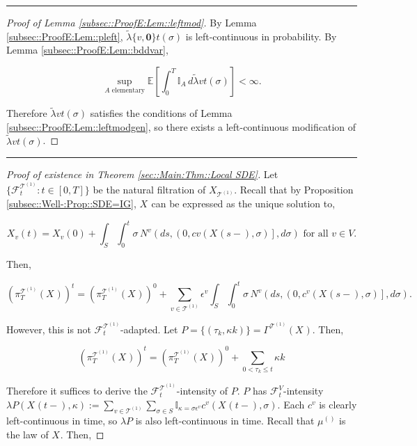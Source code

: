 \documentclass[12pt]{article}
\newcommand{\mb}{\mathbb}
\newcommand{\mc}{\mathcal}
\newcommand{\te}{\text}
\newcommand{\ep}{\epsilon}
\newcommand{\lin}{\rule{\linewidth}{0.4 pt}}
\newcommand{\ex}[1]{\mb{E}\left[#1\right]}			%
\renewcommand{\root}{\mathbf{0}}				%
\renewcommand{\v}{v}							%
\renewcommand{\S}{S}							%
\newcommand{\s}{\sigma}							%
\newcommand{\ev}{\ep}							%
\newcommand{\T}{T}								%
\renewcommand{\t}{t}							%
\newcommand{\proj}{\pi}							%
\renewcommand{\tt}{s}							%
\newcommand{\F}{\mc{F}}							%
\newcommand{\X}{X}								%
\newcommand{\IGr}{c}							%
\newcommand{\vind}[1]{^{#1}}					%
\newcommand{\vsi}[1]{^{#1}}						%
\newcommand{\cind}[1]{_{#1}}					%
\newcommand{\tp}[1]{(#1)}						%
\newcommand{\tip}[1]{#1}						%
\newcommand{\ts}[1]{_{#1}}						%
\newcommand{\tree}{\mc{T}}						%
\newcommand{\sln}[1]{^{(#1)}}					%
\newcommand{\poiss}{N}							%
\newcommand{\rate}{\lambda}						%
\newcommand{\alt}[1]{\widetilde{#1}}			%
\newcommand{\indx}[1]{_{#1}}					%
\newcommand{\m}{\mu}							%
\newcommand{\rt}{\tau}							%
\renewcommand{\it}{k}							%
\newcommand{\pmap}{\Gamma}						%
\renewcommand{\mark}{\kappa}					%
\newcommand{\rp}{P}								%
\newcommand{\typset}{A}							%
\newcommand{\crate}{\alt{\lambda}}				%
\begin{document}
\lin

\begin{proof}[Proof of Lemma \ref{subsec::ProofE:Lem::leftmod}]

By Lemma \ref{subsec::ProofE:Lem::pleft}, \(\crate{\{\v,\root\}}{\t}(\s)\) is left-continuous in probability. By Lemma \ref{subsec::ProofE:Lem::bddvar},

\[\sup_{\typset\te{ elementary}} \ex{\int_0^\T \mb{I}_{\typset}\,d\crate{\v}{\t}(\s)} < \infty.\]

Therefore \(\crate{\v}{\t}(\s)\) satisfies the conditions of Lemma \ref{subsec::ProofE:Lem::leftmodgen}, so there exists a left-continuous modification of \(\crate{\v}{\t}(\s)\).
\end{proof}

\lin

\begin{proof}[Proof of existence in Theorem \ref{sec::Main:Thm::Local SDE}]

Let \(\{\F\vsi{\tree\sln{1}}\ts{\t}:\t\in [0,\T]\}\) be the natural filtration of \(\X\cind{\tree\sln{1}}\tip{}\). Recall that by Proposition \ref{subsec::Well-:Prop::SDE=IG}, \(\X\cind{}\tip{}\) can be expressed as the unique solution to,

\[\X\cind{\v}\tp{\t} = \X\cind{\v}\tp{0} + \int_\S\int_0^\t \s\,\poiss\vind{\v}\left(d\tt,\left(0,c{\v}(\X\cind{}\tp{\tt-},\s)\right],d\s\right) \te{ for all } \v \in V.\]

Then,

\[\left(\proj\vsi{\tree\sln{1}}\ts{\T}(\X\cind{}\tip{})\right)^\t = \left(\proj\vsi{\tree\sln{1}}\ts{\T}(\X\cind{}\tip{})\right)^0 + \sum_{\v \in \tree\sln{1}}\ev\vind{\v}\int_\S\int_0^\t \s\,\poiss\vind{\v}\left(d\tt,\left(0,\IGr\vind{\v}(\X\cind{}\tp{\tt-},\s)\right],d\s\right).\]

However, this is not \(\F\vsi{\tree\sln{1}}\ts{\t}\)-adapted. Let \(\rp{} = \{(\rt\indx{\it},\mark{\it})\} = \pmap\vind{\tree\sln{1}}(\X\cind{}\tip{}).\) Then,

\[\left(\proj\vsi{\tree\sln{1}}\ts{\T}(\X\cind{}\tip{})\right)^\t = \left(\proj\vsi{\tree\sln{1}}\ts{\T}(\X\cind{}\tip{})\right)^0 + \sum_{0 < \rt\indx{\it} \leq \t}\mark{\it}\]

Therefore it suffices to derive the \(\F\vsi{\tree\sln{1}}\ts{\t}\)-intensity of \(\rp{}\). \(\rp{}\) has \(\F\vsi{V}\ts{\t}\)-intensity \(\rate{\rp{}}(\X\cind{}\tp{\t-},\mark{}) := \sum_{\v \in \tree\sln{1}}\sum_{\s\in \S}\mb{I}_{\mark{} = \s\ev\vind{\v}}\IGr\vind{\v}(\X\cind{}\tp{\t-},\s)\). Each \(\IGr\vind{\v}\) is clearly left-continuous in time, so \(\rate{\rp{}}\) is also left-continuous in time. Recall that \(\m\sln{}\ts{}\) is the law of \(\X\cind{}\tip{}\). Then,


\end{proof}
\end{document}
